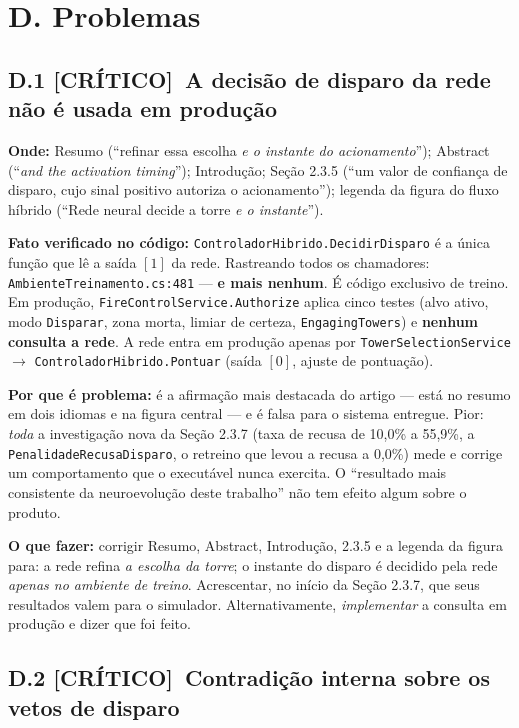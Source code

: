 \documentclass[11pt,a4paper]{article}
\newcommand{\critico}{\textbf{\color{red!60!black}[CRÍTICO]}}
\begin{document}
\section*{D. Problemas}

\subsection*{D.1 \critico\ A decisão de disparo da rede não é usada em produção}

\textbf{Onde:} Resumo (``refinar essa escolha \emph{e o instante do acionamento}''); Abstract
(``\emph{and the activation timing}''); Introdução; Seção 2.3.5 (``um valor de confiança de disparo,
cujo sinal positivo autoriza o acionamento''); legenda da figura do fluxo híbrido (``Rede neural
decide a torre \emph{e o instante}'').

\textbf{Fato verificado no código:} \texttt{ControladorHibrido.DecidirDisparo} é a única função que
lê a saída $[1]$ da rede. Rastreando todos os chamadores: \texttt{AmbienteTreinamento.cs:481} ---
\textbf{e mais nenhum}. É código exclusivo de treino. Em produção,
\texttt{FireControlService.Authorize} aplica cinco testes (alvo ativo, modo \texttt{Disparar}, zona
morta, limiar de certeza, \texttt{EngagingTowers}) e \textbf{nenhum consulta a rede}. A rede entra em
produção apenas por \texttt{TowerSelectionService} $\rightarrow$ \texttt{ControladorHibrido.Pontuar}
(saída $[0]$, ajuste de pontuação).

\textbf{Por que é problema:} é a afirmação mais destacada do artigo --- está no resumo em dois
idiomas e na figura central --- e é falsa para o sistema entregue. Pior: \emph{toda} a investigação
nova da Seção 2.3.7 (taxa de recusa de 10,0\% a 55,9\%, a \texttt{PenalidadeRecusaDisparo}, o
retreino que levou a recusa a 0,0\%) mede e corrige um comportamento que o executável nunca
exercita. O ``resultado mais consistente da neuroevolução deste trabalho'' não tem efeito algum
sobre o produto.

\textbf{O que fazer:} corrigir Resumo, Abstract, Introdução, 2.3.5 e a legenda da figura para: a rede
refina \emph{a escolha da torre}; o instante do disparo é decidido pela rede \emph{apenas no
ambiente de treino}. Acrescentar, no início da Seção 2.3.7, que seus resultados valem para o
simulador. Alternativamente, \emph{implementar} a consulta em produção e dizer que foi feito.

\subsection*{D.2 \critico\ Contradição interna sobre os vetos de disparo}
\end{document}
